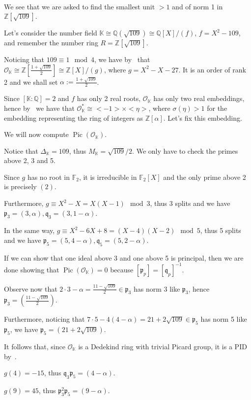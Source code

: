 \documentclass{article}
\newcommand{\numberset}{\mathbb}
\newcommand{\Z}{\numberset{Z}}
\newcommand{\Q}{\numberset{Q}}
\newcommand{\K}{\numberset{K}}
\newcommand{\F}{\numberset{F}}
\newcommand{\pid}{\mathfrak{p}}
\newcommand{\qid}{\mathfrak{q}}
\newcommand{\exercise}[1]{\noindent {\bf Exercise #1}}
\newcommand{\Pic}{\operatorname{Pic}}
\begin{document}
~\\
\exercise{6}

We see that we are asked to find the smallest unit $>1$ and of norm 1 in $\Z[\sqrt{109}]$.

Let's consider the number field $\K\cong\Q(\sqrt{109})\cong\Q[X]/(f)$, $f=X^2-109$, and remember the number ring $R=\Z[\sqrt{109}]$.

Noticing that $109\equiv 1\mod 4$, we have by~\cite[thm. 3.10]{stev} that $\mathcal{O}_{\K}\cong\Z[\frac{1+\sqrt{109}}{2}]\cong\Z[X]/(g)$, where $g=X^2-X-27$. It is an order of rank 2 and we shall set $\alpha:=\frac{1+\sqrt{109}}{2}$.

Since $[\K:\Q]=2$ and $f$ has only 2 real roots, $\mathcal{O}_{\K}$ has only two real embeddings, hence by~\cite[thm. 5.13]{stev} we have that $\mathcal{O}_{\K}^*\cong<-1>\times<\eta>$, where $\sigma(\eta)>1$ for the embedding representing the ring of integers as $\Z[\alpha]$. Let's fix this embedding.

We will now compute $\Pic(\mathcal{O}_{\K})$.

Notice that $\Delta_{\K}=109$, thus $M_{\K}=\sqrt{109}/2$. We only have to check the primes above 2, 3 and 5.

Since $g$ has no root in $\F_2$, it is irreducible in $\F_2[X]$ and the only prime above 2 is precisely $(2)$.

Furthermore, $g\equiv X^2-X=X(X-1)\mod 3$, thus 3 splits and we have $\pid_3=(3,\alpha),\qid_3=(3,1-\alpha)$.

In the same way, $g\equiv X^2-6X+8=(X-4)(X-2)\mod 5$, thus 5 splits and we have $\pid_5=(5,4-\alpha),\qid_5=(5,2-\alpha)$.

If we can show that one ideal above 3 and one above 5 is principal, then we are done showing that $\Pic(\mathcal{O}_{\K})=0$ because $[\pid_p]=[\qid_p]^{-1}$.

Observe now that $2\cdot 3-\alpha=\frac{11-\sqrt{109}}{2}\in\pid_3$ has norm 3 like $\pid_3$, hence $\pid_3=(\frac{11-\sqrt{109}}{2})$.

Furthermore, noticing that $7\cdot 5-4(4-\alpha)=21+2\sqrt{109}\in\pid_5$ has norm 5 like $\pid_5$, we have $\pid_5=(21+2\sqrt{109})$.

It follows that, since $\mathcal{O}_{\K}$ is a Dedekind ring with trivial Picard group, it is a PID by~\cite[ex. 2.39]{stev}.

$g(4)=-15$, thus $\qid_3\pid_5=(4-\alpha)$.

$g(9)=45$, thus $\pid_3^2\pid_5=(9-\alpha)$.
\end{document}
